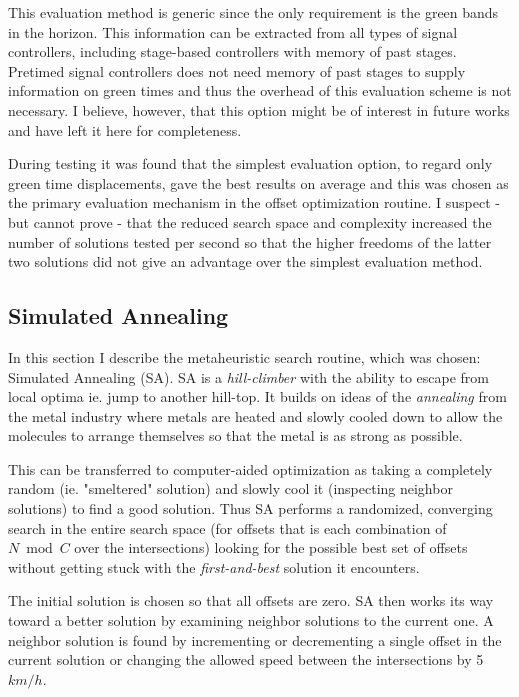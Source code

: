 \begin{description}
This evaluation method is generic since the only requirement is the green bands in the horizon. This information can be extracted from all types of signal controllers, including stage-based controllers with memory of past stages. Pretimed signal controllers does not need memory of past stages to supply information on green times and thus the overhead of this evaluation scheme is not necessary. I believe, however, that this option might be of interest in future works and have left it here for completeness.

\end{description}

During testing it was found that the simplest evaluation option, to regard only green time displacements, gave the best results on average and this was chosen as the primary evaluation mechanism in the offset optimization routine. I suspect - but cannot prove - that the reduced search space and complexity increased the number of solutions tested per second so that the higher freedoms of the latter two solutions did not give an advantage over the simplest evaluation method.

\subsection{Simulated Annealing}
\label{siman}
In this section I describe the metaheuristic search routine, which was chosen: Simulated Annealing (SA). 
SA is a \textit{hill-climber} with the ability to escape from local optima ie. jump to another hill-top. It builds on ideas of the \textit{annealing} from the metal industry where metals are heated and slowly cooled down to allow the molecules to arrange themselves so that the metal is as strong as possible.

This can be transferred to computer-aided optimization as taking a completely random (ie. "smeltered" solution) and slowly cool it (inspecting neighbor solutions) to find a good solution. Thus SA performs a randomized, converging search in the entire search space (for offsets that is each combination of $N \bmod C$ over the intersections) looking for the possible best set of offsets without getting stuck with the \textit{first-and-best} solution it encounters.

The initial solution is chosen so that all offsets are zero. SA then works its way toward a better solution by examining neighbor solutions to the current one. A neighbor solution is found by incrementing or decrementing a single offset in the current solution or changing the allowed speed between the intersections by 5$km/h$.

